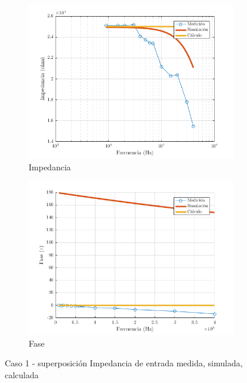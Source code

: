 \documentclass[../../main.tex]{subfiles}
\begin{document}
\begin{figure}[H]
\centering
\begin{subfigure}[http]{0.49\textwidth}
\includegraphics[width=\textwidth]{z_n_r_c1}
\caption{Impedancia}\label{fig=znZc1}
\end{subfigure}
\begin{subfigure}[http]{0.49\textwidth}
\includegraphics[width=\textwidth]{z_n_f_c1}
\caption{Fase} \label{fig=znFc1}
\end{subfigure}
\caption{Caso 1 - superposición Impedancia de entrada  medida, simulada, calculada}
\end{figure}
\end{document}
